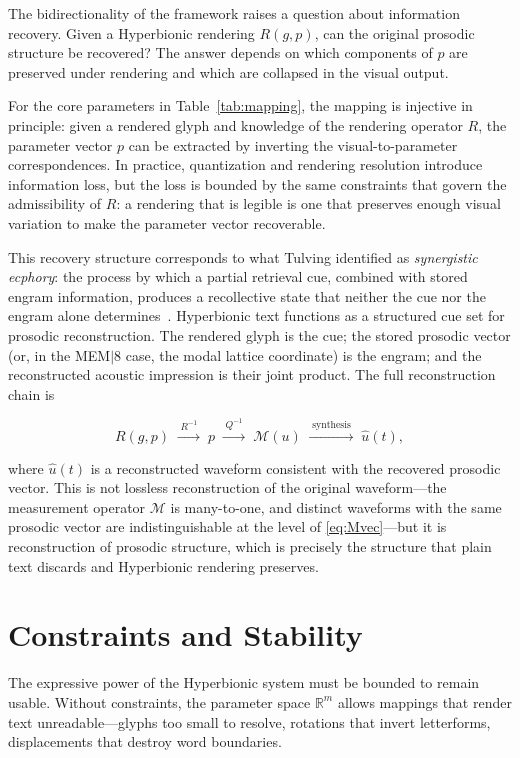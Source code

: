 \documentclass[12pt, a4paper]{article}
\begin{document}
The bidirectionality of the framework raises a question about information recovery. Given a Hyperbionic rendering $R(g, p)$, can the original prosodic structure be recovered? The answer depends on which components of $p$ are preserved under rendering and which are collapsed in the visual output.

For the core parameters in Table~\ref{tab:mapping}, the mapping is injective in principle: given a rendered glyph and knowledge of the rendering operator $R$, the parameter vector $p$ can be extracted by inverting the visual-to-parameter correspondences. In practice, quantization and rendering resolution introduce information loss, but the loss is bounded by the same constraints that govern the admissibility of $R$: a rendering that is legible is one that preserves enough visual variation to make the parameter vector recoverable.

This recovery structure corresponds to what Tulving identified as \emph{synergistic ecphory}: the process by which a partial retrieval cue, combined with stored engram information, produces a recollective state that neither the cue nor the engram alone determines~\cite{Tulving1982}. Hyperbionic text functions as a structured cue set for prosodic reconstruction. The rendered glyph is the cue; the stored prosodic vector (or, in the MEM$|$8 case, the modal lattice coordinate) is the engram; and the reconstructed acoustic impression is their joint product. The full reconstruction chain is

\begin{equation}
R(g, p) \;\xrightarrow{\;R^{-1}\;}\; p \;\xrightarrow{\;Q^{-1}\;}\; \mathcal{M}(u) \;\xrightarrow{\;\text{synthesis}\;}\; \hat{u}(t),
\label{eq:recon}
\end{equation}

where $\hat{u}(t)$ is a reconstructed waveform consistent with the recovered prosodic vector. This is not lossless reconstruction of the original waveform---the measurement operator $\mathcal{M}$ is many-to-one, and distinct waveforms with the same prosodic vector are indistinguishable at the level of \eqref{eq:Mvec}---but it is reconstruction of prosodic structure, which is precisely the structure that plain text discards and Hyperbionic rendering preserves.

\section{Constraints and Stability}

The expressive power of the Hyperbionic system must be bounded to remain usable. Without constraints, the parameter space $\mathbb{R}^m$ allows mappings that render text unreadable---glyphs too small to resolve, rotations that invert letterforms, displacements that destroy word boundaries.
\end{document}
